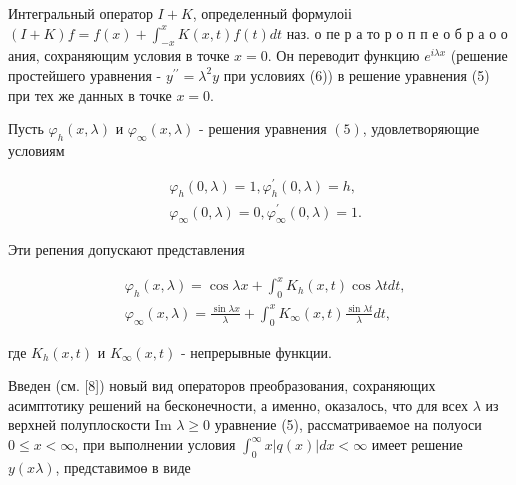 \documentclass[10pt]{article}
\begin{document}
Интегральный оператор $I+K$, определенный формулоіі $(I+K) f=f(x)+\int_{-x}^{x} K(x, t) f(t) d t$ наз. о пе р а то р о п п е о б р а о о ания, сохраняющим условия в точке $x=0$. Он переводит функцию $e^{i \lambda x}$ (решение простейшего уравнения - $y^{\prime \prime}=\lambda^{2} y$ при условиях (6)) в решение уравнения (5) при тех же данных в точке $x=0$.



Пусть $\varphi_{h}(x, \lambda)$ и $\varphi_{\infty}(x, \lambda)$ - решения уравнения $(5)$, удовлетворяющие условиям



\[

\begin{aligned}

& \varphi_{h}(0, \lambda)=1, \varphi_{h}^{\prime}(0, \lambda)=h, \\

& \varphi_{\infty}(0, \lambda)=0, \varphi_{\infty}^{\prime}(0, \lambda)=1 .

\end{aligned}

\]



Эти репения допускают представления



\[

\begin{aligned}

& \varphi_{h}(x, \lambda)=\cos \lambda x+\int_{0}^{x} K_{h}(x, t) \cos \lambda t d t, \\

& \varphi_{\infty}(x, \lambda)=\frac{\sin \lambda x}{\lambda}+\int_{0}^{x} K_{\infty}(x, t) \frac{\sin \lambda t}{\lambda} d t,

\end{aligned}

\]



где $K_{h}(x, t)$ и $K_{\infty}(x, t)$ - непрерывные функции.



Введен (см. [8]) новый вид операторов преобразования, сохраняющих асимптотику решений на бесконечности, а именно, оказалось, что для всех $\lambda$ из верхней полуплоскости Im $\lambda \geqslant 0$ уравнение (5), рассматриваемое на полуоси $0 \leqslant x<\infty$, при выполнении условия $\int_{0}^{\infty} x|q(x)| d x<\infty$ имеет решение $y(x \lambda)$, представимоө в виде
\end{document}
